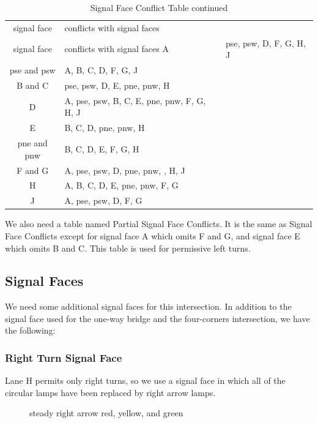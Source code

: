 \documentclass[letterpaper,twoside]{article}
\begin{document}
\begin{longtable}{c | l}
  \caption{Signal Face Conflict Table} \\
  signal face & conflicts with signal faces \endfirsthead
  \caption{Signal Face Conflict Table continued} \\
  signal face & conflicts with signal faces \endhead
  \hline
  A & pse, psw, D, F, G, H, J \\
  pse and psw & A, B, C, D, F, G, J \\
  B and C & pse, psw, D, E, pne, pnw, H \\
  D & A, pse, psw, B, C, E, pne, pnw, F, G, H, J \\
  E & B, C, D, pne, pnw, H \\
  pne and pnw & B, C, D, E, F, G, H \\
  F and G & A, pse, psw, D, pne, pnw, , H, J \\
  H & A, B, C, D, E, pne, pnw, F, G \\
  J & A, pse, psw, D, F, G \\
\end{longtable}

We also need a table named Partial Signal Face Conflicts.  It is the same
as Signal Face Conflicts except for signal face A which omits F and G,
and signal face E which omits B and C.  This table is used for permissive
left turns.

\subsection{Signal Faces}

We need some additional signal faces for this intersection.  In addition
to the signal face used for the one-way bridge and the four-corners
intersection, we have the following:

\subsubsection{Right Turn Signal Face}

Lane H permits only right turns, so we use a signal face in which all of
the circular lamps have been replaced by right arrow lamps.

\begin{figure}[H]
           {\caption{steady right arrow red, yellow, and
               green}\label{fig:signal_rrr}}
\end{figure}
\end{document}
